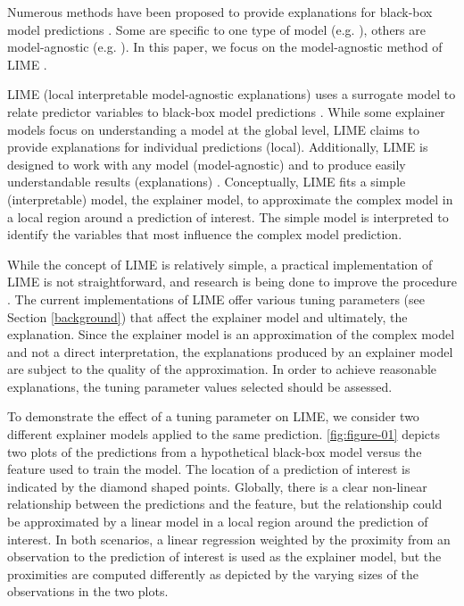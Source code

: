 \documentclass[AMS,STIX2COL]{WileyNJD-v2}\usepackage[]{graphicx}\usepackage[]{color}
\begin{document}
Numerous methods have been proposed to provide explanations for black-box model predictions \citep{gilpin:2018, guidotti:2018, ming:2017, molnar:2019}. Some are specific to one type of model (e.g. \citep{simonyan:2013, urbanek:2008}), others are model-agnostic (e.g. \citep{fisher:2018, strumbelj:2014}). In this paper, we focus on the  model-agnostic method of LIME \citep{ribeiro:2016}.

LIME (local interpretable model-agnostic explanations) uses a surrogate model to relate predictor variables to black-box model predictions  \citep{ribeiro:2016}. While some explainer models focus on understanding a model at the global level, LIME claims to provide explanations for individual predictions (local). Additionally, LIME is designed to work with any model (model-agnostic) and to produce easily understandable results (explanations) \citep{ribeiro:2016}. Conceptually, LIME fits a simple (interpretable) model, the explainer model, to approximate  the complex model in a local region around a prediction of interest. The simple model is interpreted to identify the variables that most influence the complex model prediction.

While the concept of LIME is relatively simple, a practical implementation of LIME is not straightforward, and research is being done to improve the procedure \citep{laugel:2018}. The current implementations of LIME \citep{pedersen:2020, ribeiro:2020} offer various tuning parameters (see Section \ref{background}) that affect the explainer model and ultimately, the explanation. Since the explainer model is an approximation of the complex model and not a direct interpretation, the explanations produced by an explainer model are subject to the quality of the approximation. In order to achieve reasonable explanations, the tuning parameter values selected should  be assessed.

To demonstrate the effect of a tuning parameter on LIME, we consider two different explainer models applied to the same prediction. \autoref{fig:figure-01} depicts two plots of the predictions from a hypothetical black-box model versus the feature used to train the model. The location of a prediction of interest is indicated by the diamond shaped points. Globally, there is a clear non-linear relationship between the predictions and the feature, but the relationship could be approximated by a linear model in a local region around the prediction of interest. In both scenarios, a linear regression weighted by the proximity from an observation to the prediction of interest is used as the explainer model, but the proximities are computed differently as depicted by the varying sizes of the observations in the two plots.
\end{document}
